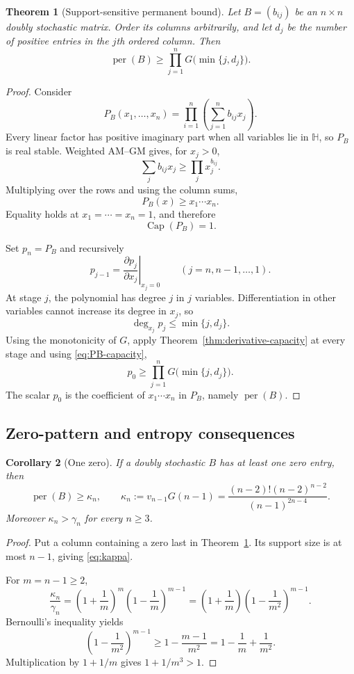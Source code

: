\documentclass[11pt]{article}
\newtheorem{theorem}{Theorem}[section]
\newtheorem{corollary}[theorem]{Corollary}
\theoremstyle{definition}
\newcommand{\per}{\operatorname{per}}
\newcommand{\pcap}{\operatorname{Cap}}
\newcommand{\1}{\mathbf{1}}
\newcommand{\cH}{\mathbb{H}}
\begin{document}
\begin{theorem}[Support-sensitive permanent bound]\label{thm:support-bound}
Let $B=(b_{ij})$ be an $n\times n$ doubly stochastic matrix.  Order its columns arbitrarily, and let $d_j$ be the number of positive entries in the $j$th ordered column.  Then
\[
 \per(B)\ge
 \prod_{j=1}^nG\bigl(\min\{j,d_j\}\bigr).
 \tag{3.4}\label{eq:support-bound}
\]
\end{theorem}

\begin{proof}
Consider
\[
 P_B(x_1,\dots,x_n)
 =\prod_{i=1}^n\left(\sum_{j=1}^n b_{ij}x_j\right).
\]
Every linear factor has positive imaginary part when all variables lie in $\cH$, so $P_B$ is real stable.  Weighted AM--GM gives, for $x_j>0$,
\[
 \sum_jb_{ij}x_j\ge\prod_jx_j^{b_{ij}}.
\]
Multiplying over the rows and using the column sums,
\[
 P_B(x)\ge x_1\cdots x_n.
\]
Equality holds at $x_1=\cdots=x_n=1$, and therefore
\[
 \pcap(P_B)=1.
 \tag{3.5}\label{eq:PB-capacity}
\]

Set $p_n=P_B$ and recursively
\[
 p_{j-1}
 =\left.\frac{\partial p_j}{\partial x_j}\right|_{x_j=0}
 \qquad(j=n,n-1,\dots,1).
\]
At stage $j$, the polynomial has degree $j$ in $j$ variables.  Differentiation in other variables cannot increase its degree in $x_j$, so
\[
 \deg_{x_j}p_j\le\min\{j,d_j\}.
\]
Using the monotonicity of $G$, apply Theorem~\ref{thm:derivative-capacity} at every stage and using \eqref{eq:PB-capacity},
\[
 p_0\ge\prod_{j=1}^nG\bigl(\min\{j,d_j\}\bigr).
\]
The scalar $p_0$ is the coefficient of $x_1\cdots x_n$ in $P_B$, namely $\per(B)$.
\end{proof}

\subsection{Zero-pattern and entropy consequences}

\begin{corollary}[One zero]\label{cor:one-zero}
If a doubly stochastic $B$ has at least one zero entry, then
\[
 \per(B)\ge\kappa_n,
 \qquad
 \kappa_n:=v_{n-1}G(n-1)
 =\frac{(n-2)!(n-2)^{n-2}}{(n-1)^{2n-4}}.
 \tag{3.6}\label{eq:kappa}
\]
Moreover $\kappa_n>\gamma_n$ for every $n\ge3$.
\end{corollary}

\begin{proof}
Put a column containing a zero last in Theorem~\ref{thm:support-bound}.  Its support size is at most $n-1$, giving \eqref{eq:kappa}.

For $m=n-1\ge2$,
\[
 \frac{\kappa_n}{\gamma_n}
 =\left(1+\frac1m\right)^m
  \left(1-\frac1m\right)^{m-1}
 =\left(1+\frac1m\right)
  \left(1-\frac1{m^2}\right)^{m-1}.
\]
Bernoulli's inequality yields
\[
 \left(1-\frac1{m^2}\right)^{m-1}
 \ge1-\frac{m-1}{m^2}
 =1-\frac1m+\frac1{m^2}.
\]
Multiplication by $1+1/m$ gives $1+1/m^3>1$.
\end{proof}
\end{document}
